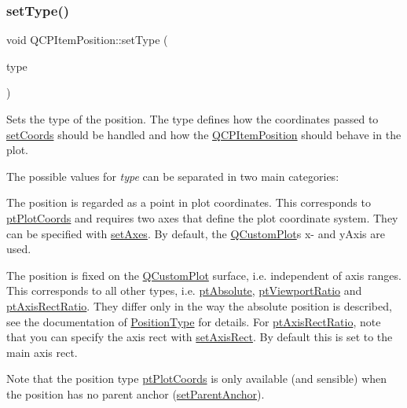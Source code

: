 \subsubsection{\texorpdfstring{set\+Type()}{setType()}}
{\footnotesize\ttfamily void Q\+C\+P\+Item\+Position\+::set\+Type (\begin{DoxyParamCaption}\item[{\hyperlink{classQCPItemPosition_aad9936c22bf43e3d358552f6e86dbdc8}{Q\+C\+P\+Item\+Position\+::\+Position\+Type}}]{type }\end{DoxyParamCaption})}

Sets the type of the position. The type defines how the coordinates passed to \hyperlink{classQCPItemPosition_aa988ba4e87ab684c9021017dcaba945f}{set\+Coords} should be handled and how the \hyperlink{classQCPItemPosition}{Q\+C\+P\+Item\+Position} should behave in the plot.

The possible values for {\itshape type} can be separated in two main categories\+:

\begin{DoxyItemize}
\item The position is regarded as a point in plot coordinates. This corresponds to \hyperlink{classQCPItemPosition_aad9936c22bf43e3d358552f6e86dbdc8ad5ffb8dc99ad73263f7010c77342294c}{pt\+Plot\+Coords} and requires two axes that define the plot coordinate system. They can be specified with \hyperlink{classQCPItemPosition_a2185f45c75ac8cb9be89daeaaad50e37}{set\+Axes}. By default, the \hyperlink{classQCustomPlot}{Q\+Custom\+Plot}\textquotesingle{}s x-\/ and y\+Axis are used.\end{DoxyItemize}
\begin{DoxyItemize}
\item The position is fixed on the \hyperlink{classQCustomPlot}{Q\+Custom\+Plot} surface, i.\+e. independent of axis ranges. This corresponds to all other types, i.\+e. \hyperlink{classQCPItemPosition_aad9936c22bf43e3d358552f6e86dbdc8a564f5e53e550ead1ec5fc7fc7d0b73e0}{pt\+Absolute}, \hyperlink{classQCPItemPosition_aad9936c22bf43e3d358552f6e86dbdc8ac7d6aa89ceacb39658b0d6da061c789a}{pt\+Viewport\+Ratio} and \hyperlink{classQCPItemPosition_aad9936c22bf43e3d358552f6e86dbdc8a01080fd00eaf09fa238ef6b73bbfef75}{pt\+Axis\+Rect\+Ratio}. They differ only in the way the absolute position is described, see the documentation of \hyperlink{classQCPItemPosition_aad9936c22bf43e3d358552f6e86dbdc8}{Position\+Type} for details. For \hyperlink{classQCPItemPosition_aad9936c22bf43e3d358552f6e86dbdc8a01080fd00eaf09fa238ef6b73bbfef75}{pt\+Axis\+Rect\+Ratio}, note that you can specify the axis rect with \hyperlink{classQCPItemPosition_a0cd9b326fb324710169e92e8ca0041c2}{set\+Axis\+Rect}. By default this is set to the main axis rect.\end{DoxyItemize}
Note that the position type \hyperlink{classQCPItemPosition_aad9936c22bf43e3d358552f6e86dbdc8ad5ffb8dc99ad73263f7010c77342294c}{pt\+Plot\+Coords} is only available (and sensible) when the position has no parent anchor (\hyperlink{classQCPItemPosition_ac094d67a95d2dceafa0d50b9db3a7e51}{set\+Parent\+Anchor}).

